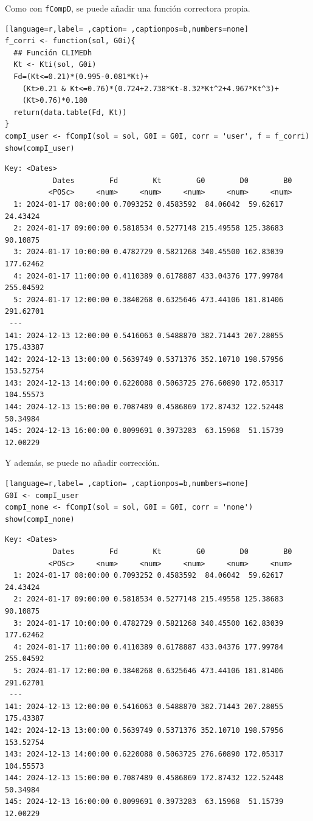 \begin{itemize}
Como con \texttt{fCompD}, se puede añadir una función correctora propia.
\begin{lstlisting}[language=r,label= ,caption= ,captionpos=b,numbers=none]
f_corri <- function(sol, G0i){
  ## Función CLIMEDh
  Kt <- Kti(sol, G0i)
  Fd=(Kt<=0.21)*(0.995-0.081*Kt)+
    (Kt>0.21 & Kt<=0.76)*(0.724+2.738*Kt-8.32*Kt^2+4.967*Kt^3)+
    (Kt>0.76)*0.180
  return(data.table(Fd, Kt))
}
compI_user <- fCompI(sol = sol, G0I = G0I, corr = 'user', f = f_corri)
show(compI_user)
\end{lstlisting}

\begin{verbatim}
Key: <Dates>
		   Dates        Fd        Kt        G0        D0        B0
		  <POSc>     <num>     <num>     <num>     <num>     <num>
  1: 2024-01-17 08:00:00 0.7093252 0.4583592  84.06042  59.62617  24.43424
  2: 2024-01-17 09:00:00 0.5818534 0.5277148 215.49558 125.38683  90.10875
  3: 2024-01-17 10:00:00 0.4782729 0.5821268 340.45500 162.83039 177.62462
  4: 2024-01-17 11:00:00 0.4110389 0.6178887 433.04376 177.99784 255.04592
  5: 2024-01-17 12:00:00 0.3840268 0.6325646 473.44106 181.81406 291.62701
 ---                                                                      
141: 2024-12-13 12:00:00 0.5416063 0.5488870 382.71443 207.28055 175.43387
142: 2024-12-13 13:00:00 0.5639749 0.5371376 352.10710 198.57956 153.52754
143: 2024-12-13 14:00:00 0.6220088 0.5063725 276.60890 172.05317 104.55573
144: 2024-12-13 15:00:00 0.7087489 0.4586869 172.87432 122.52448  50.34984
145: 2024-12-13 16:00:00 0.8099691 0.3973283  63.15968  51.15739  12.00229
\end{verbatim}

Y además, se puede no añadir corrección.
\begin{lstlisting}[language=r,label= ,caption= ,captionpos=b,numbers=none]
G0I <- compI_user
compI_none <- fCompI(sol = sol, G0I = G0I, corr = 'none')
show(compI_none)
\end{lstlisting}

\begin{verbatim}
Key: <Dates>
		   Dates        Fd        Kt        G0        D0        B0
		  <POSc>     <num>     <num>     <num>     <num>     <num>
  1: 2024-01-17 08:00:00 0.7093252 0.4583592  84.06042  59.62617  24.43424
  2: 2024-01-17 09:00:00 0.5818534 0.5277148 215.49558 125.38683  90.10875
  3: 2024-01-17 10:00:00 0.4782729 0.5821268 340.45500 162.83039 177.62462
  4: 2024-01-17 11:00:00 0.4110389 0.6178887 433.04376 177.99784 255.04592
  5: 2024-01-17 12:00:00 0.3840268 0.6325646 473.44106 181.81406 291.62701
 ---                                                                      
141: 2024-12-13 12:00:00 0.5416063 0.5488870 382.71443 207.28055 175.43387
142: 2024-12-13 13:00:00 0.5639749 0.5371376 352.10710 198.57956 153.52754
143: 2024-12-13 14:00:00 0.6220088 0.5063725 276.60890 172.05317 104.55573
144: 2024-12-13 15:00:00 0.7087489 0.4586869 172.87432 122.52448  50.34984
145: 2024-12-13 16:00:00 0.8099691 0.3973283  63.15968  51.15739  12.00229
\end{verbatim}


\end{itemize}
